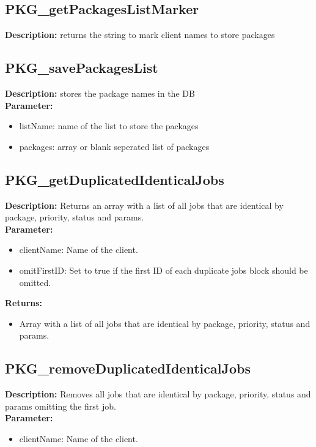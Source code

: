 \subsection{PKG\_getPackagesListMarker}
\textbf{Description:} returns the string to mark client names to store packages\\

\subsection{PKG\_savePackagesList}
\textbf{Description:} stores the package names in the DB\\
\textbf{Parameter:}
\begin{itemize}
\item listName: name of the list to store the packages 
\item packages: array or blank seperated list of packages
\end{itemize}

\subsection{PKG\_getDuplicatedIdenticalJobs}
\textbf{Description:} Returns an array with a list of all jobs that are identical by package, priority, status and params.\\
\textbf{Parameter:}
\begin{itemize}
\item clientName: Name of the client.
\item omitFirstID: Set to true if the first ID of each duplicate jobs block should be omitted.
\end{itemize}
\textbf{Returns:}
\begin{itemize}
\item Array with a list of all jobs that are identical by package, priority, status and params.
\end{itemize}

\subsection{PKG\_removeDuplicatedIdenticalJobs}
\textbf{Description:} Removes all jobs that are identical by package, priority, status and params omitting the first job.\\
\textbf{Parameter:}
\begin{itemize}
\item clientName: Name of the client.
\end{itemize}

